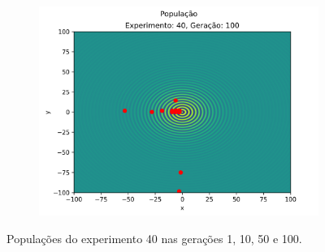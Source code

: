 \documentclass[12pt]{article}
\begin{document}
\begin{figure}[htb]
\begin{subfigure}{.5\textwidth}
	  \end{subfigure}
	  \begin{subfigure}{.5\textwidth}
		\centering
		\includegraphics[width=0.9\linewidth]{./imgs/results/0_population_gen_100_exp_40.png}
	  \end{subfigure}
	\caption{Populações do experimento 40 nas gerações 1, 10, 50 e 100.}
	\end{figure}
\end{document}
